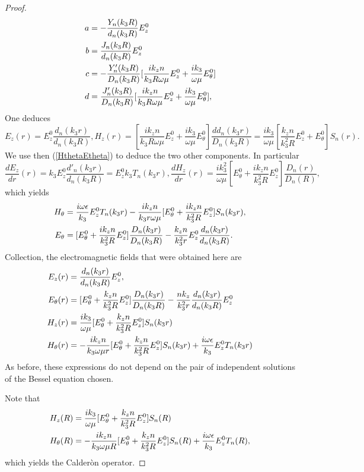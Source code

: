\documentclass[12pt,%
    twoside,%
    a4paper,%
    openright, %
    ]{book}
\numberwithin{equation}{section} %
\renewcommand{\frac}[2]{\dfrac{#1}{#2}} %
\begin{document}
\begin{proof}
            \begin{align*}
                a&=-\frac{Y_n(k_3R)}{d_n(k_3R)}E_z^0
                \cr
                b&=\frac{J_n(k_3R)}{d_n(k_3R)}E_z^0
                \cr
                c&=-\frac{Y'_n(k_3R)}{D_n(k_3R)}[\frac{ik_zn}{k_3R\omega \mu}E^0_z+\frac{ik_3}{\omega \mu}E_{\theta}^0]
                \cr
                d&=\frac{J'_n(k_3R)}{D_n(k_3R)}[\frac{ik_zn}{k_3R\omega \mu}E^0_z+\frac{ik_3}{\omega \mu}E_{\theta}^0],
            \end{align*}
            One deduces
            $$E_z(r)=E_z^0\frac{d_n(k_3r)}{d_n(k_3R)}, H_z(r)=[\frac{ik_zn}{k_3R\omega \mu}E^0_z+\frac{ik_3}{\omega \mu}E_{\theta}^0]\frac{dd_n(k_3r)}{D_n(k_3R)}=\frac{ik_3}{\omega \mu}[\frac{k_zn}{k_3^2R}E^0_z+E_{\theta}^0]S_n(r).$$
            We use then (\ref{HthetaEtheta}) to deduce the two other components. In particular
            $$\frac{dE_z}{dr}(r)=k_3E_z^0\frac{d'_n(k_3r)}{d_n(k_3R)}=E_z^0k_3T_n(k_3r),\frac{dH_z}{dr}(r)=\frac{ik_3^2}{\omega \mu}[E_{\theta}^0+\frac{ik_zn}{k_3^2R}E^0_z]\frac{D_n(r)}{D_n(R)},$$
            which yields
            \begin{align*}
                H_{\theta}&=\frac{i\omega \epsilon}{k_3}E_z^0T_n(k_3r)-\frac{ik_zn}{k_3r\omega \mu}[E_{\theta}^0+\frac{ik_zn}{k_3^2R}E^0_z]S_n(k_3r),
                \cr
                E_{\theta}&=[E_{\theta}^0+\frac{ik_zn}{k_3^2R}E^0_z]\frac{D_n(k_3r)}{D_n(k_3R)}-\frac{k_zn}{k_3^2r}E_z^0\frac{d_n(k_3r)}{d_n(k_3R)}.
            \end{align*}
            Collection, the electromagnetic fields that were obtained here are 
            \begin{align}
                E_z(r)&=\frac{d_n(k_3r)}{d_n(k_3R)}E_z^0,
                \cr
                E_{\theta}(r)&=[E_{\theta}^0+\frac{k_zn}{k_3^2R}E^0_z]\frac{D_n(k_3r)}{D_n(k_3R)}-\frac{nk_z}{k_3^2 r}\frac{d_n(k_3r)}{d_n(k_3R)}E_z^0
                \cr
                H_z(r)&=\frac{ik_3}{\omega \mu}[E_{\theta}^0+\frac{k_zn}{k_3^2R}E^0_z]S_n(k_3r)
                \cr
                H_{\theta}(r)&=-\frac{ik_zn}{k_3\omega \mu r}[E_{\theta}^0+\frac{k_zn}{k_3^2R}E^0_z]S_n(k_3r)+\frac{i\omega \epsilon}{k_3}E_z^0T_n(k_3r)
            \label{formal-solutions}
            \end{align}
            As before, these expressions do not depend on the pair of independent solutions of the Bessel equation chosen.

            Note that 
            \begin{align*}
                H_z(R)&=\frac{ik_3}{\omega \mu}[E_{\theta}^0+\frac{k_zn}{k_3^2R}E^0_z]S_n(R)
                \cr
                H_{\theta}(R)&=-\frac{ik_zn}{k_3\omega \mu R}[E_{\theta}^0+\frac{k_zn}{k_3^2R}E^0_z]S_n(R)+\frac{i\omega \epsilon}{k_3}E_z^0T_n(R),
            \end{align*}
            which yields the Calder\`on operator.
            \end{proof}
\end{document}
